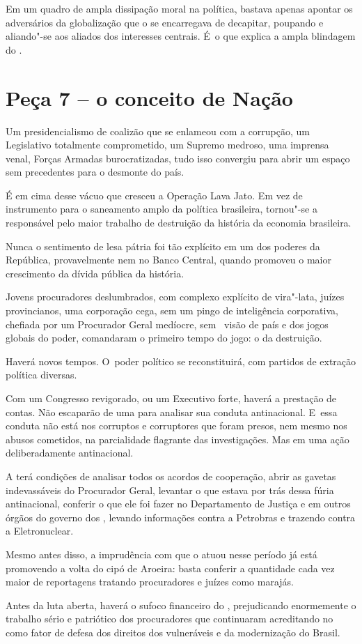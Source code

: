 Em um quadro de ampla dissipação moral na política, bastava apenas
apontar os adversários da globalização que o  se encarregava de
decapitar, poupando e aliando"-se aos aliados dos interesses centrais. É~o que explica a ampla blindagem do .

\section{Peça 7 -- o conceito de Nação}

 Um presidencialismo de coalizão que se enlameou com a corrupção, um
Legislativo totalmente comprometido, um Supremo medroso, uma imprensa
venal, Forças Armadas burocratizadas, tudo isso convergiu para abrir um
espaço sem precedentes para o desmonte do país.

É em cima desse vácuo que cresceu a Operação Lava Jato. Em vez de
instrumento para o saneamento amplo da política brasileira, tornou"-se a
responsável pelo maior trabalho de destruição da história da economia
brasileira.

Nunca o sentimento de lesa pátria foi tão explícito em um dos poderes da
República, provavelmente nem no Banco Central, quando promoveu o maior
crescimento da dívida pública da história.

Jovens procuradores deslumbrados, com complexo explícito de vira"-lata,
juízes provincianos, uma corporação cega, sem um pingo de inteligência
corporativa, chefiada por um Procurador Geral medíocre, sem ~visão de
país e dos jogos globais do poder, comandaram o primeiro tempo do jogo:
o da destruição.

Haverá novos tempos. O~poder político se reconstituirá, com partidos de
extração política diversas.

Com um Congresso revigorado, ou um Executivo forte, haverá a prestação
de contas. Não escaparão de uma  para analisar sua conduta
antinacional. E~essa conduta não está nos corruptos e corruptores que
foram presos, nem mesmo nos abusos cometidos, na parcialidade flagrante
das investigações. Mas em uma ação deliberadamente antinacional.

A  terá condições de analisar todos os acordos de cooperação, abrir
as gavetas indevassáveis do Procurador Geral, levantar o que estava por
trás dessa fúria antinacional, conferir o que ele foi fazer no
Departamento de Justiça e em outros órgãos do governo dos , levando
informações contra a Petrobras e trazendo contra a Eletronuclear.

Mesmo antes disso, a imprudência com que o  atuou nesse período já
está promovendo a volta do cipó de Aroeira: basta conferir a quantidade
cada vez maior de reportagens tratando procuradores e juízes como
marajás.

Antes da luta aberta, haverá o sufoco financeiro do , prejudicando
enormemente o trabalho sério e patriótico dos procuradores que
continuaram acreditando no  como fator de defesa dos direitos dos
vulneráveis e da modernização do Brasil.
